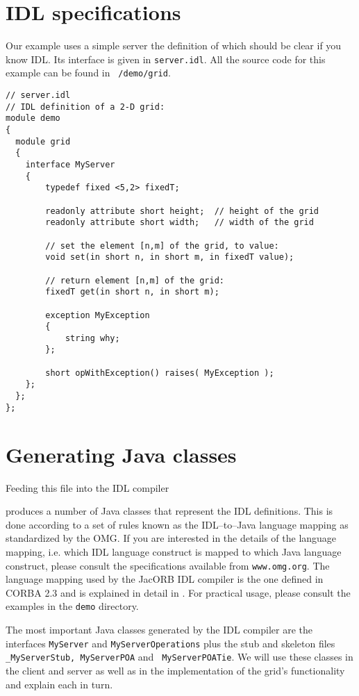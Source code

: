 \documentclass[12pt]{scrbook}
\begin{document}
\section{IDL specifications}

Our example uses a simple server the definition of which should be
clear if you know IDL. Its interface is given in {\tt server.idl}. All
the source code for this example can be found in {\tt
  \JacORBDir/demo/grid}.

\small{
\begin{verbatim}
// server.idl
// IDL definition of a 2-D grid:
module demo
{
  module grid 
  { 
    interface MyServer
    {
        typedef fixed <5,2> fixedT;

        readonly attribute short height;  // height of the grid
        readonly attribute short width;   // width of the grid

        // set the element [n,m] of the grid, to value:
        void set(in short n, in short m, in fixedT value);

        // return element [n,m] of the grid:
        fixedT get(in short n, in short m);
        
        exception MyException
        {
            string why;
        };

        short opWithException() raises( MyException );
    };
  };
};
\end{verbatim}
}

\section{Generating Java classes}

Feeding this file into the IDL compiler 


produces a number of Java  classes that represent the IDL definitions.
This is  done according to a  set of rules known  as the IDL--to--Java
language mapping as standardized by  the OMG. If you are interested in
the details of the language mapping, i.e. which IDL language construct
is  mapped  to  which  Java  language construct,  please  consult  the
specifications available from  {\tt www.omg.org}. The language mapping
used by the JacORB IDL compiler is the one defined in CORBA 2.3 and is
explained in detail in  \cite{Brose2001a}. For practical usage, please
consult the examples in the {\tt demo} directory.

The most important Java classes  generated by the IDL compiler are the
interfaces {\tt  MyServer} and {\tt MyServerOperations}  plus the stub
and  skeleton   files  {\tt  \_MyServerStub,   MyServerPOA}  and  {\tt
MyServerPOATie}.  We will  use these classes in the  client and server
as  well as  in the  implementation  of the  grid's functionality  and
explain each in turn.
\end{document}
